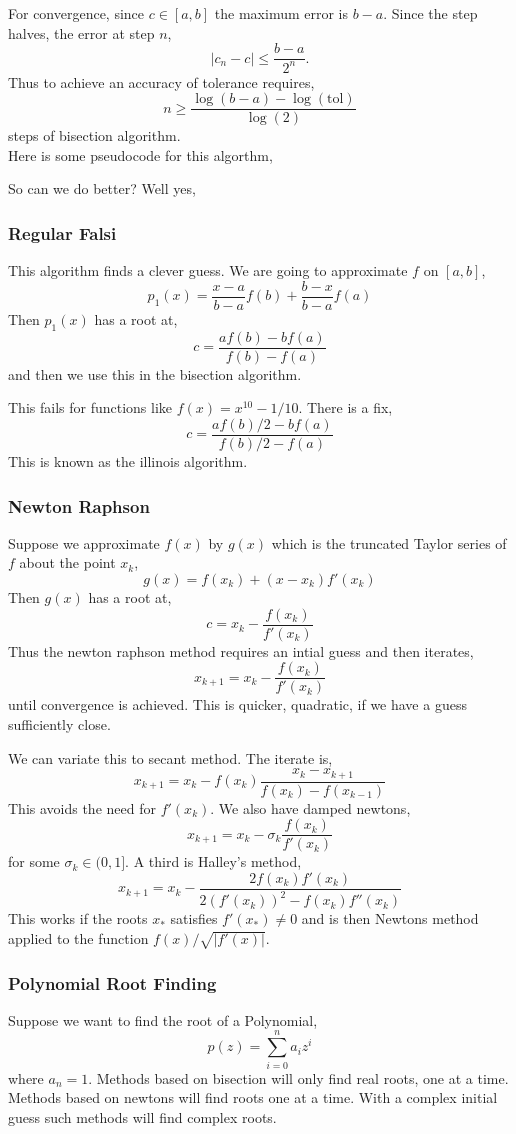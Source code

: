 For convergence, since $c \in [a, b]$ the maximum error is $b - a$. Since the step halves, the error at step $n$,
$$ |c_n - c| \le \frac{b - a}{2^n}. $$
Thus to achieve an accuracy of tolerance requires,
$$ n \ge \frac{\log(b - a) - \log(\mathrm{tol})}{\log (2)} $$
steps of bisection algorithm.\\

Here is some pseudocode for this algorthm,

So can we do better? Well yes,
\subsubsection{Regular Falsi}
This algorithm finds a clever guess. We are going to approximate $f$ on $[a, b]$,
$$ p_1(x) = \frac{x - a}{b - a} f(b) + \frac{b - x}{b - a} f(a)$$
Then $p_1(x)$ has a root at,
$$ c = \frac{af(b) - bf(a)}{f(b) - f(a)} $$
and then we use this in the bisection algorithm.

This fails for functions like $f(x) = x^{10} - 1/10$. There is a fix,
$$ c = \frac{af(b)/2 - bf(a)}{f(b)/2 - f(a)} $$
This is known as the illinois algorithm.

\subsubsection{Newton Raphson}
Suppose we approximate $f(x)$ by $g(x)$ which is the truncated Taylor series of $f$ about the point $x_k$,
$$ g(x) = f(x_k) + (x - x_k)f'(x_k) $$
Then $g(x)$ has a root at,
$$ c = x_k - \frac{f(x_k)}{f'(x_k)} $$
Thus the newton raphson method requires an intial guess and then iterates,
$$ x_{k+1} = x_k - \frac{f(x_k)}{f'(x_k)} $$
until convergence is achieved. This is quicker, quadratic, if we have a guess sufficiently close.


We can variate this to secant method. The iterate is,
$$ x_{k+1} = x_k - f(x_k)\frac{x_k - x_{k+1}}{f(x_k) - f(x_{k-1})} $$
This avoids the need for $f'(x_k)$. We also have damped newtons,
$$ x_{k+1} = x_k - \sigma_k \frac{f(x_k)}{f'(x_k)} $$
for some $\sigma_k \in (0, 1]$. A third is Halley's method,
$$ x_{k+1} = x_k - \frac{2f(x_k)f'(x_k)}{2(f'(x_k))^2 - f(x_k)f''(x_k)} $$
This works if the roots $x_*$ satisfies $f'(x_*) \ne 0$ and is then Newtons method applied to the function $f(x) / \sqrt{|f'(x)|}$.

\subsubsection{Polynomial Root Finding}
Suppose we want to find the root of a Polynomial,
$$ p(z) = \sum_{i=0}^n a_i z^i $$
where $a_n = 1$. Methods based on bisection will only find real roots, one at a time. Methods based on newtons will find roots one at a time. With a complex initial guess such methods will find complex roots.\\

